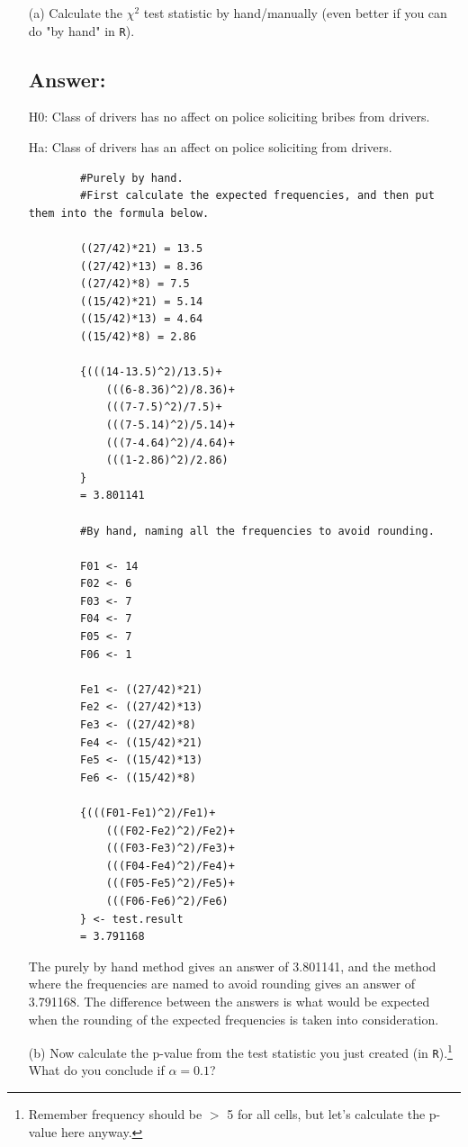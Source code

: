 \documentclass[12pt,letterpaper]{article}
\begin{document}
\begin{enumerate}
	
	\item [(a)]
	Calculate the $\chi^2$ test statistic by hand/manually (even better if you can do "by hand" in \texttt{R}).\\
	\vspace{0cm}
	\subsection*{Answer:}
	H0: Class of drivers has no affect on police soliciting bribes from drivers.
	
	Ha: Class of drivers has an affect on police soliciting from drivers.
	\begin{verbatim}
		#Purely by hand.
		#First calculate the expected frequencies, and then put them into the formula below.
		
		((27/42)*21) = 13.5
		((27/42)*13) = 8.36
		((27/42)*8) = 7.5
		((15/42)*21) = 5.14
		((15/42)*13) = 4.64
		((15/42)*8) = 2.86
		
		{(((14-13.5)^2)/13.5)+
			(((6-8.36)^2)/8.36)+
			(((7-7.5)^2)/7.5)+ 
			(((7-5.14)^2)/5.14)+
			(((7-4.64)^2)/4.64)+   
			(((1-2.86)^2)/2.86)
		} 
		= 3.801141
		
		#By hand, naming all the frequencies to avoid rounding.
		
		F01 <- 14
		F02 <- 6
		F03 <- 7
		F04 <- 7
		F05 <- 7
		F06 <- 1
		
		Fe1 <- ((27/42)*21)
		Fe2 <- ((27/42)*13)
		Fe3 <- ((27/42)*8)
		Fe4 <- ((15/42)*21)
		Fe5 <- ((15/42)*13)
		Fe6 <- ((15/42)*8)
		
		{(((F01-Fe1)^2)/Fe1)+
			(((F02-Fe2)^2)/Fe2)+
			(((F03-Fe3)^2)/Fe3)+
			(((F04-Fe4)^2)/Fe4)+
			(((F05-Fe5)^2)/Fe5)+
			(((F06-Fe6)^2)/Fe6)
		} <- test.result
		= 3.791168
	\end{verbatim}
	
	The purely by hand method gives an answer of 3.801141, and the method where the frequencies are named to avoid rounding gives an answer of 3.791168. The difference between the answers is what would be expected when the rounding of the expected frequencies is taken into consideration.
	
	
	\item [(b)]
	Now calculate the p-value from the test statistic you just created (in \texttt{R}).\footnote{Remember frequency should be $>$ 5 for all cells, but let's calculate the p-value here anyway.}  What do you conclude if $\alpha = 0.1$?\\

\end{enumerate}
\end{document}
